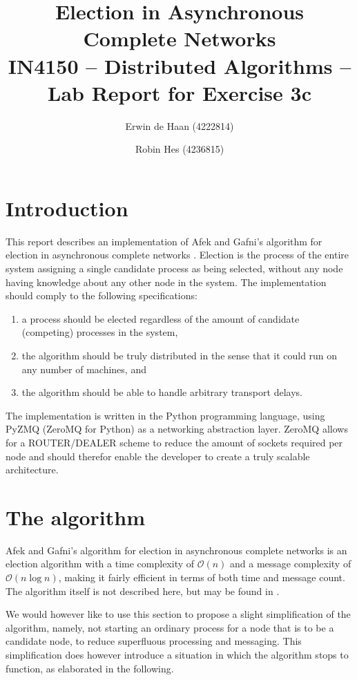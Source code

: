 \documentclass{article}
\title{Election in Asynchronous Complete Networks\\{\large IN4150 -- Distributed Algorithms -- Lab Report for Exercise 3c}}
\author{Erwin de Haan (4222814) \and Robin Hes (4236815)}
\begin{document}
\maketitle

\section{Introduction}
This report describes an implementation of Afek and Gafni's algorithm for election in asynchronous complete networks \cite{afek1985time}. Election is the process of the entire system assigning a single candidate process as being selected, without any node having knowledge about any other node in the system. The implementation should comply to the following specifications:

\begin{enumerate}
	\item a process should be elected regardless of the amount of candidate (competing) processes in the system,
	\item the algorithm should be truly distributed in the sense that it could run on any number of machines, and
	\item the algorithm should be able to handle arbitrary transport delays.
\end{enumerate}

The implementation is written in the Python programming language, using PyZMQ (ZeroMQ for Python) as a networking abstraction layer. ZeroMQ allows for a ROUTER/DEALER scheme to reduce the amount of sockets required per node and should therefor enable the developer to create a truly scalable architecture.

\section{The algorithm}
Afek and Gafni's algorithm for election in asynchronous complete networks is an election algorithm with a time complexity of $\mathcal{O}(n)$ and a message complexity of $\mathcal{O}(n\log n)$, making it fairly efficient in terms of both time and message count. The algorithm itself is not described here, but may be found in \cite[p.12]{afek1985time}.

We would however like to use this section to propose a slight simplification of the algorithm, namely, not starting an ordinary process for a node that is to be a candidate node, to reduce superfluous processing and messaging. This simplification does however introduce a situation in which the algorithm stops to function, as elaborated in the following.
\end{document}
